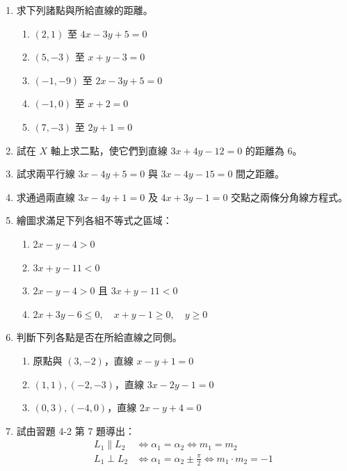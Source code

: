 \begin{enumerate}[label=\arabic*., leftmargin=2em]
  \item 求下列諸點與所給直線的距離。
  \begin{enumerate}[label=(\roman*), leftmargin=2em]
    \item $(2, 1)$ 至 $4x - 3y + 5 = 0$
    \item $(5, -3)$ 至 $x + y - 3 = 0$
    \item $(-1, -9)$ 至 $2x - 3y + 5 = 0$
    \item $(-1, 0)$ 至 $x + 2 = 0$
    \item $(7, -3)$ 至 $2y + 1 = 0$
  \end{enumerate}
  
  \item 試在 $X$ 軸上求二點，使它們到直線 $3x + 4y - 12 = 0$ 的距離為 6。
  
  \item 試求兩平行線 $3x - 4y + 5 = 0$ 與 $3x - 4y - 15 = 0$ 間之距離。
  
  \item 求通過兩直線 $3x - 4y + 1 = 0$ 及 $4x + 3y - 1 = 0$ 交點之兩條分角線方程式。
  
  \item 繪圖求滿足下列各組不等式之區域：
  \begin{enumerate}[label=(\roman*), leftmargin=2em]
    \item $2x - y - 4 > 0$
    \item $3x + y - 11 < 0$
    \item $2x - y - 4 > 0$ 且 $3x + y - 11 < 0$
    \item $2x + 3y - 6 \le 0, \quad x + y - 1 \ge 0, \quad y \ge 0$
  \end{enumerate}
  
  \item 判斷下列各點是否在所給直線之同側。
  \begin{enumerate}[label=(\roman*), leftmargin=2em]
    \item 原點與 $(3, -2)$，直線 $x - y + 1 = 0$
    \item $(1, 1), (-2, -3)$，直線 $3x - 2y - 1 = 0$
    \item $(0, 3), (-4, 0)$，直線 $2x - y + 4 = 0$
  \end{enumerate}
  
  \item 試由習題 4-2 第 7 題導出：
  \begin{align*}
  L_1 \parallel L_2 &\iff \alpha_1 = \alpha_2 \iff m_1 = m_2 \\
  L_1 \perp L_2 &\iff \alpha_1 = \alpha_2 \pm \frac{\pi}{2} \iff m_1 \cdot m_2 = -1
  \end{align*}
  

\end{enumerate}
